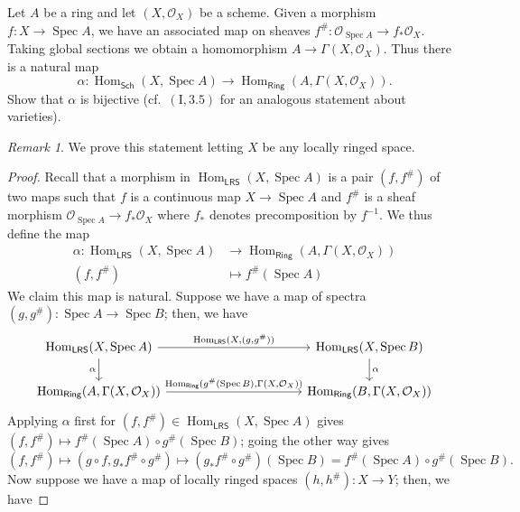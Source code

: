 \documentclass[10pt]{article}
\theoremstyle{definition}
\theoremstyle{remark}
\newtheorem*{remark}{Remark}
\numberwithin{equation}{section}
\numberwithin{figure}{subsubsection}
\DeclareMathOperator{\Spec}{Spec}
\DeclareMathOperator{\Hom}{Hom}
\newcommand{\OO}{\mathcal{O}}
\newcommand{\LRS}{\mathsf{LRS}}
\newcommand{\Sch}{\mathsf{Sch}}
\newcommand{\Ring}{\mathsf{Ring}}
\begin{document}
\begin{problem}
  Let $A$ be a ring and let $(X,\OO_X)$ be a scheme. Given a morphism $f\colon X \to \Spec A$, we have an associated map on sheaves $f^\#\colon\OO_{\Spec A} \to f_*\OO_X$. Taking global sections we obtain a homomorphism $A \to \Gamma(X,\OO_X)$. Thus there is a natural map
  \begin{equation*}
    \alpha\colon\Hom_{\Sch}(X,\Spec A) \to \Hom_\Ring(A,\Gamma(X,\OO_X)).
  \end{equation*}
  Show that $\alpha$ is bijective (cf.~$(\mathrm{I},3.5)$ for an analogous statement about varieties).
\end{problem}
\begin{remark}
  We prove this statement letting $X$ be any locally ringed space.
\end{remark}
\begin{proof}
  Recall that a morphism in $\Hom_{\mathsf{LRS}}(X,\Spec A)$ is a pair $(f,f^\#)$ of two maps such that $f$ is a continuous map $X \to \Spec A$ and $f^\#$ is a sheaf morphism $\OO_{\Spec A} \to f_* \OO_X$ where $f_*$ denotes precomposition by $f^{-1}$. We thus define the map
  \begin{align*}
    \alpha\colon \Hom_{\mathsf{LRS}}(X,\Spec A) &\longrightarrow \Hom_\Ring(A,\Gamma(X,\mathcal{O}_X))\\
    (f,f^\#) &\longmapsto f^\#(\Spec A)
  \end{align*}
  We claim this map is natural. Suppose we have a map of spectra $(g,g^\#)\colon \Spec A \to \Spec B$; then, we have
  \begin{equation*}
    \begin{tikzcd}[column sep=25ex]
      \Hom_\mathsf{LRS}(X,\Spec A) \rar{\Hom_\LRS(X,(g,g^\#))}\dar[swap]{\alpha} & \Hom_\mathsf{LRS}(X,\Spec B)\dar{\alpha}\\
      \Hom_\Ring(A,\Gamma(X,\OO_X)) \rar{\Hom_\Ring(g^\#(\Spec B),\Gamma(X,\OO_X))} & \Hom_\Ring(B,\Gamma(X,\OO_X))
    \end{tikzcd}
  \end{equation*}
  Applying $\alpha$ first for $(f,f^\#) \in \Hom_\mathsf{LRS}(X,\Spec A)$ gives $(f,f^\#) \mapsto f^\#(\Spec A) \circ g^\#(\Spec B)$; going the other way gives
  \begin{equation*}
    (f,f^\#) \mapsto (g \circ f,g_*f^\# \circ g^\#) \mapsto (g_*f^\# \circ g^\#)(\Spec B) = f^\#(\Spec A) \circ g^\#(\Spec B).
  \end{equation*}
  Now suppose we have a map of locally ringed spaces $(h,h^\#) \colon X \to Y$; then, we have

\end{proof}
\end{document}
